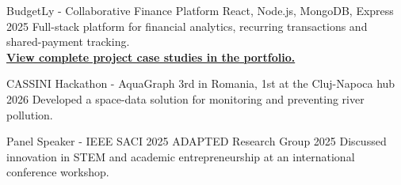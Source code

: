 \documentclass[10pt]{spidercv}
\begin{document}
\begin{MainPart}
  \Experience
    {\ColorHighlight}
    {BudgetLy - Collaborative Finance Platform}
    {React, Node.js, MongoDB, Express}
    {\textcolor{\ColorTextMain}{2025}}
    {Full-stack platform for financial analytics, recurring transactions and shared-payment tracking.\\
     \href{https://portofolio-carla-barastean.netlify.app/\#projects}{\textbf{View complete project case studies in the portfolio.}}}

  \Experience
    {\ColorHighlight}
    {CASSINI Hackathon - AquaGraph}
    {3rd in Romania, 1st at the Cluj-Napoca hub}
    {\textcolor{\ColorTextMain}{2026}}
    {Developed a space-data solution for monitoring and preventing river pollution.}

  \Experience
    {\ColorHighlight}
    {Panel Speaker - IEEE SACI 2025}
    {ADAPTED Research Group}
    {\textcolor{\ColorTextMain}{2025}}
    {Discussed innovation in STEM and academic entrepreneurship at an international conference workshop.}

\end{MainPart}
\end{document}
